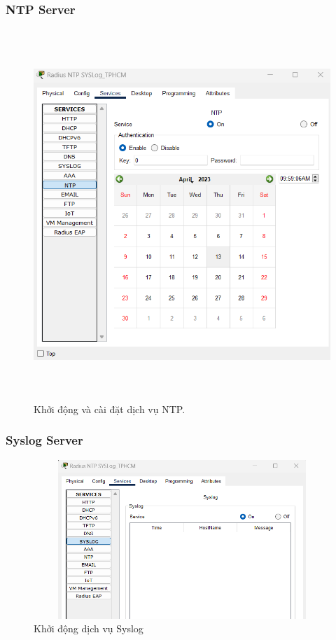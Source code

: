 \documentclass[12pt,a4paper]{report}
\begin{document}
\subsubsection{NTP Server}
\begin{figure}[H]
    \centering
    \includegraphics[width=16cm, height=14cm]{img/NTP1.png}
    \caption{ Khởi động và cài đặt dịch vụ NTP.}
    \label{hinh426}
\end{figure}
\subsubsection{Syslog Server }
\begin{figure}[H]
    \centering
    \includegraphics[width=16cm, height=6cm]{img/syslog1.png}
    \caption{ Khởi động dịch vụ Syslog}
    \label{hinh427}
\end{figure}
\end{document}
